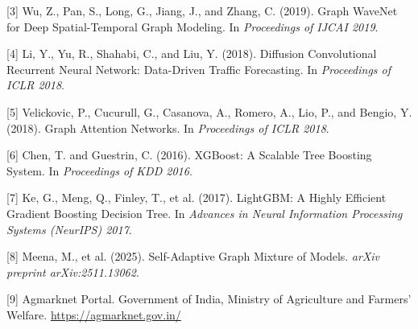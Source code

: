 \documentclass[conference]{IEEEtran}
\begin{document}
[3] Wu, Z., Pan, S., Long, G., Jiang, J., and Zhang, C. (2019). Graph WaveNet for Deep Spatial-Temporal Graph Modeling. In \textit{Proceedings of IJCAI 2019}.

[4] Li, Y., Yu, R., Shahabi, C., and Liu, Y. (2018). Diffusion Convolutional Recurrent Neural Network: Data-Driven Traffic Forecasting. In \textit{Proceedings of ICLR 2018}.

[5] Velickovic, P., Cucurull, G., Casanova, A., Romero, A., Lio, P., and Bengio, Y. (2018). Graph Attention Networks. In \textit{Proceedings of ICLR 2018}.

[6] Chen, T. and Guestrin, C. (2016). XGBoost: A Scalable Tree Boosting System. In \textit{Proceedings of KDD 2016}.

[7] Ke, G., Meng, Q., Finley, T., et al. (2017). LightGBM: A Highly Efficient Gradient Boosting Decision Tree. In \textit{Advances in Neural Information Processing Systems (NeurIPS) 2017}.

[8] Meena, M., et al. (2025). Self-Adaptive Graph Mixture of Models. \textit{arXiv preprint arXiv:2511.13062}.

[9] Agmarknet Portal. Government of India, Ministry of Agriculture and Farmers' Welfare. \url{https://agmarknet.gov.in/}
\end{document}

